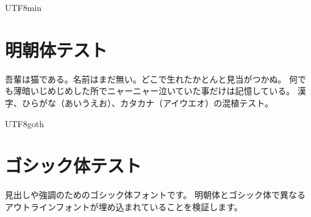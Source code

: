 \documentclass{article}
\begin{document}
\begin{CJK}{UTF8}{min}
\section*{明朝体テスト}
吾輩は猫である。名前はまだ無い。どこで生れたかとんと見当がつかぬ。
何でも薄暗いじめじめした所でニャーニャー泣いていた事だけは記憶している。
漢字、ひらがな（あいうえお）、カタカナ（アイウエオ）の混植テスト。
\end{CJK}

\bigskip

\begin{CJK}{UTF8}{goth}
\section*{ゴシック体テスト}
見出しや強調のためのゴシック体フォントです。
明朝体とゴシック体で異なるアウトラインフォントが埋め込まれていることを検証します。
\end{CJK}
\end{document}
